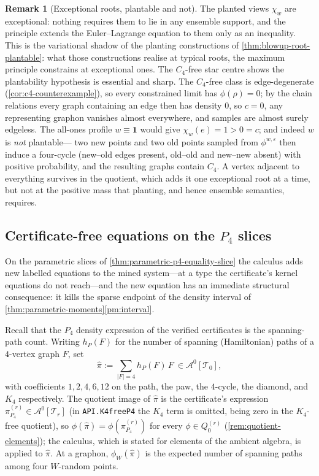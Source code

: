\documentclass[11pt]{article}
\theoremstyle{definition}
\newtheorem{remark}[remark]{Remark}
\newcommand{\A}{\mathcal{A}}
\newcommand{\T}{\mathcal{T}}
\newcommand{\eps}{\varepsilon}
\newcommand{\one}{\mathbf 1}
\begin{document}
\begin{remark}[Exceptional roots, plantable and not]\label{rem:planted-scope}
The planted views $\chi_w$ are exceptional: nothing requires them to lie in any
ensemble support, and the principle extends the Euler--Lagrange equation to them only
as an inequality.  This is the variational shadow of the planting constructions of
\cref{thm:blowup-root-plantable}: what those constructions realise at typical roots,
the maximum principle constrains at exceptional ones.  The $C_4$-free star centre shows
the plantability hypothesis is essential and sharp.  The $C_4$-free class is
edge-degenerate (\cref{cor:c4-counterexample}), so every constrained limit has
$\phi(\rho)=0$; by the chain relations every graph containing an edge then has density
$0$, so $c=0$, any representing graphon vanishes almost everywhere, and samples are
almost surely edgeless.  The all-ones profile
$w\equiv\one$ would give $\chi_w(e)=1>0=c$; and indeed $w$ is \emph{not} plantable---
two new points and two old points sampled from $\phi^{w,\eps}$ then induce a
four-cycle (new--old edges present, old--old and new--new absent) with positive
probability, and the resulting graphs contain $C_4$.  A vertex adjacent to everything
survives in the quotient, which
adds it one exceptional root at a time, but not at the positive mass that planting, and
hence ensemble semantics, requires.
\end{remark}

\subsection{Certificate-free equations on the \texorpdfstring{$P_4$}{P4} slices}

On the parametric slices of \cref{thm:parametric-p4-equality-slice} the calculus adds
new labelled equations to the mined system---at a type the certificate's kernel
equations do not reach---and the new equation has an immediate structural consequence:
it kills the sparse endpoint of the density interval of
\cref{thm:parametric-moments}\ref{pm:interval}.

Recall that the $P_4$ density expression of the verified certificates is the spanning-path
count.  Writing $h_P(F)$ for the number of spanning (Hamiltonian) paths of a $4$-vertex
graph $F$, set
\[
  \widehat\pi:=\sum_{|F|=4}h_P(F)\,F\ \in\A^0[\T_0],
\]
with coefficients $1,2,4,6,12$ on the path, the paw, the $4$-cycle, the diamond, and
$K_4$ respectively.  The quotient image of $\widehat\pi$ is the certificate's
expression $\pi_{P_4}^{(r)}\in\A^0[\T_r]$ (in \texttt{API.K4freeP4} the $K_4$ term is
omitted, being zero in the $K_4$-free quotient), so
$\phi(\widehat\pi)=\phi(\pi_{P_4}^{(r)})$ for every $\phi\in Q_0^{(r)}$
(\cref{rem:quotient-elements}); the calculus, which is stated for elements of the
ambient algebra, is applied to $\widehat\pi$.  At a graphon,
$\phi_W(\widehat\pi)$ is the expected number of spanning paths among four $W$-random
points.
\end{document}
